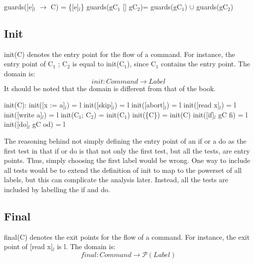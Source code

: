 guards([e]$_l$ $\to$ C)      = \{[e]$_l$\} \newline
guards(gC$_1$ [] gC$_2$)= guards(gC$_1$) $\cup$ guards(gC$_2$)\newline

\subsection{Init}

init(C) denotes the entry point for the flow of a command.
For instance, the entry point of C$_1$ ; C$_2$ is equal to init(C$_1$),
since C$_1$ contains the entry point. The domain is:
\[init \colon Command \to Label\]
It should be noted that the domain is different from that of the book.

init(C):\newline
init([x := a]$_l$)      = l\newline
init([skip]$_l$)        = l\newline
init([abort]$_l$)       = l\newline
init([read x]$_l$)      = l\newline
init([write a]$_l$)     = l\newline
init(C$_1$; C$_2$)        = init(C$_1$)\newline
init(\{C\})             = init(C)\newline
init([if]$_l$ gC fi)        = l\newline
init([do]$_l$ gC od)        = l\newline

The reasoning behind not simply defining the entry point of an if or a do as the first
test in that if or do is that not only the first test, but all the tests, are entry points.
Thus, simply choosing the first label would be wrong. One way to include all tests would
be to extend the definition of init to map to the powerset of all labels, but this
can complicate the analysis later. Instead, all the tests are included by labelling
the if and do.



\subsection{Final}

final(C) denotes the exit points for the flow of a command.
For instance, the exit point of [read x]$_l$ is l. The domain is:
\[final \colon Command \to \mathcal{P}(Label)\]

\docpar

